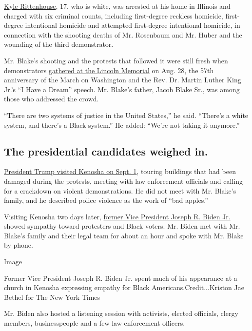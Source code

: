 \href{https://www.nytimes3xbfgragh.onion/2020/08/27/us/kyle-rittenhouse-kenosha.html}{Kyle
Rittenhouse}, 17, who is white, was arrested at his home in Illinois and
charged with six criminal counts, including first-degree reckless
homicide, first-degree intentional homicide and attempted first-degree
intentional homicide, in connection with the shooting deaths of Mr.
Rosenbaum and Mr. Huber and the wounding of the third demonstrator.

Mr. Blake's shooting and the protests that followed it were still fresh
when demonstrators
\href{https://www.nytimes3xbfgragh.onion/2020/08/28/us/kenosha-shooting-protests.html\#link-6676ec97}{gathered
at the Lincoln Memorial} on Aug. 28, the 57th anniversary of the March
on Washington and the Rev. Dr. Martin Luther King Jr.'s ``I Have a
Dream'' speech. Mr. Blake's father, Jacob Blake Sr., was among those who
addressed the crowd.

``There are two systems of justice in the United States,'' he said.
``There's a white system, and there's a Black system.'' He added:
``We're not taking it anymore.''

\hypertarget{the-presidential-candidates-weighed-in}{%
\subsection{The presidential candidates weighed
in.}\label{the-presidential-candidates-weighed-in}}

\href{https://www.nytimes3xbfgragh.onion/live/2020/09/01/us/trump-vs-biden}{President
Trump visited Kenosha on Sept. 1}, touring buildings that had been
damaged during the protests, meeting with law enforcement officials and
calling for a crackdown on violent demonstrations. He did not meet with
Mr. Blake's family, and he described police violence as the work of
``bad apples.''

Visiting Kenosha two days later,
\href{https://www.nytimes3xbfgragh.onion/2020/09/03/us/politics/joe-biden-kenosha.html}{former
Vice President Joseph R. Biden Jr.} showed sympathy toward protesters
and Black voters. Mr. Biden met with Mr. Blake's family and their legal
team for about an hour and spoke with Mr. Blake by phone.

Image

Former Vice President Joseph R. Biden Jr. spent much of his appearance
at a church in Kenosha expressing empathy for Black
Americans.Credit...Kriston Jae Bethel for The New York Times

Mr. Biden also hosted a listening session with activists, elected
officials, clergy members, businesspeople and a few law enforcement
officers.

